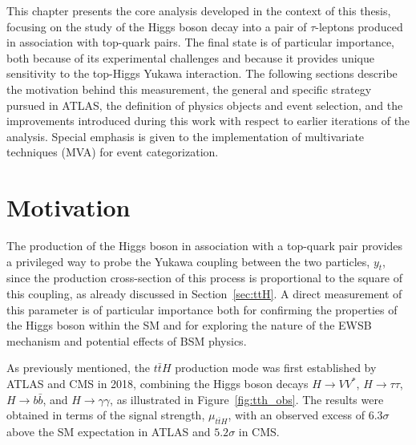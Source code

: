 \newcommand*{\pth}{$p^{H}_{\text{T}}$\xspace}
\newcommand*{\htautau}{$H \to \tau \tau$\xspace}
\newcommand*{\ztautau}{$Z \to \tau \tau$\xspace}
\newcommand*{\pt}{$p_{\text{T}}$\xspace}
\newcommand*{\taul}{$\tau$-lepton\xspace}
\newcommand*{\tauhadvis}{\ensuremath{\tauhad}\xspace}
\newcommand*{\mmc}{\ensuremath{m^\text{MMC}_{\tau\tau}}\xspace}
\newcommand*{\taulephad}{$\tau_{\text{lep}}\tau_{\text{had}}$\xspace}
\newcommand*{\tauhadhad}{$\tau_{\text{had}}\tau_{\text{had}}$\xspace}
\newcommand*{\mtt}{\ensuremath{m_{\tau\tau}}\xspace}


This chapter presents the core analysis developed in the context of this thesis, focusing on the study of the Higgs boson decay into a pair of $\tau$-leptons produced in association with top-quark pairs. The \ttHtt final state is of particular importance, both because of its experimental challenges and because it provides unique sensitivity to the top-Higgs Yukawa interaction. The following sections describe the motivation behind this measurement, the general and specific strategy pursued in ATLAS, the definition of physics objects and event selection, and the improvements introduced during this work with respect to earlier iterations of the analysis. Special emphasis is given to the implementation of multivariate techniques (MVA) for event categorization.


\section{Motivation}
\label{sec:analysis_motivation}

The production of the Higgs boson in association with a top-quark pair provides a privileged way to probe the Yukawa coupling between the two particles, $y_{t}$, since the production cross-section of this process is proportional to the square of this coupling, as already discussed in Section~\ref{sec:ttH}. A direct measurement of this parameter is of particular importance both for confirming the properties of the Higgs boson within the SM and for exploring the nature of the EWSB mechanism and potential effects of BSM physics.

As previously mentioned, the $t\bar{t}H$ production mode was first established by ATLAS and CMS in 2018, combining the Higgs boson decays $H \to VV^{*}$, $H \to \tau\tau$, $H \to b\bar{b}$, and $H \to \gamma\gamma$, as illustrated in Figure~\ref{fig:tth_obs}. The results were obtained in terms of the signal strength, $\mu_{t\bar{t}H}$, with an observed excess of $6.3\sigma$ above the SM expectation in ATLAS and $5.2\sigma$ in CMS.

